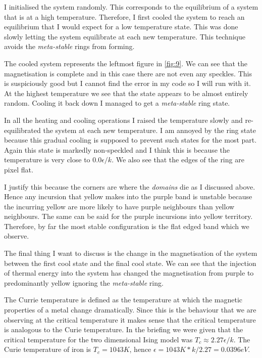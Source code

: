 \documentclass[a4paper, twocolumn]{article}
\begin{document}
I initialised the system randomly. This corresponds to the %
equilibrium of a system that is at a high temperature. %
Therefore, I first cooled the system to reach an equilibrium %
that I would expect for a low temperature state. This was done %
slowly letting the system equilibrate at each new temperature. %
This technique avoids the \emph{meta-stable} rings from forming. 


The cooled system represents the leftmost figure in \ref{fig:9}. %
We can see that the magnetisation is complete and in this case %
there are not even any speckles. This is suspiciously good but %
I cannot find the error in my code so I will run with it. At %
the highest temperature we see that the state appears to be %
almost entirely random. Cooling it back down I managed to get %
a \emph{meta-stable} ring state.


In all the heating and cooling operations I raised the temperature %
slowly and re-equilibrated the system at each new temperature. %
I am annoyed by the ring state because this gradual cooling is %
supposed to prevent such states for the most part. Again this %
state is markedly non-speckled and I think this is because the %
temperature is very close to \(0.0 \epsilon / k\). We also see %
that the edges of the ring are pixel flat. 


I justify this because the corners are where the \emph{domains} %
die as I discussed above. Hence any incursion that yellow makes %
into the purple band is unstable because the incurring yellow %
are more likely to have purple neighbours than yellow neighbours. %
The same can be said for the purple incursions into yellow %
territory. Therefore, by far the most stable configuration is %
the flat edged band which we observe. 


The final thing I want to discuss is the change in the magnetisation %
of the system between the first cool state and the final cool state. %
We can see that the injection of thermal energy into the system %
has changed the magnetisation from purple to predominantly yellow %
ignoring the \emph{meta-stable} ring. 


The Currie temperature is defined as the temperature at which the %
magnetic properties of a metal change dramatically. Since this is %
the behaviour that we are observing at the critical temperature %
it makes sense that the critical temperature is analogous to the %
Curie temperature. In the briefing %
we were given that the critical temperature for the two dimensional %
Ising model was \(T_{c} \approx 2.27\epsilon / k\). The Curie %
temperature of iron is \(T_{c} = 1043K\), hence \(\epsilon = %
1043K * k / 2.27 = 0.0396eV\). 
\end{document}
